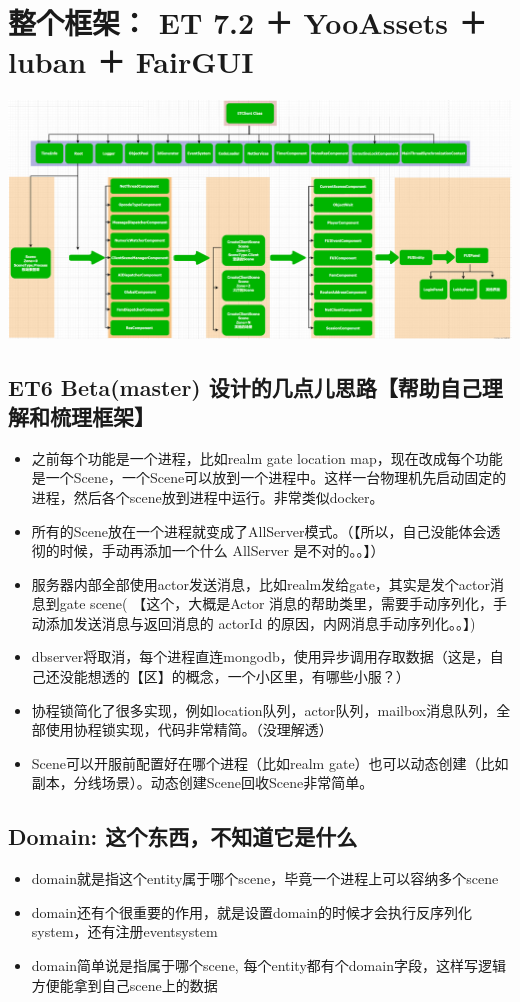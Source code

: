 \documentclass[9pt, b5paper]{article}
\begin{document}
\section{整个框架： ET 7.2 ＋ YooAssets ＋ luban ＋ FairGUI}
\label{sec-13}

\includegraphics[width=.9\linewidth]{./pic/ET_20230512_143227.png}
\subsection{ET6 Beta(master) 设计的几点儿思路【帮助自己理解和梳理框架】}
\label{sec-13-1}
\begin{itemize}
\item 之前每个功能是一个进程，比如realm gate location map，现在改成每个功能是一个Scene，一个Scene可以放到一个进程中。这样一台物理机先启动固定的进程，然后各个scene放到进程中运行。非常类似docker。
\item 所有的Scene放在一个进程就变成了AllServer模式。（【所以，自己没能体会透彻的时候，手动再添加一个什么 AllServer 是不对的。。】）
\item 服务器内部全部使用actor发送消息，比如realm发给gate，其实是发个actor消息到gate scene( 【这个，大概是Actor 消息的帮助类里，需要手动序列化，手动添加发送消息与返回消息的 actorId 的原因，内网消息手动序列化。。】)
\item dbserver将取消，每个进程直连mongodb，使用异步调用存取数据（这是，自己还没能想透的【区】的概念，一个小区里，有哪些小服？）
\item 协程锁简化了很多实现，例如location队列，actor队列，mailbox消息队列，全部使用协程锁实现，代码非常精简。（没理解透）
\item Scene可以开服前配置好在哪个进程（比如realm gate）也可以动态创建（比如副本，分线场景）。动态创建Scene回收Scene非常简单。
\end{itemize}
\subsection{Domain: 这个东西，不知道它是什么}
\label{sec-13-2}
\begin{itemize}
\item domain就是指这个entity属于哪个scene，毕竟一个进程上可以容纳多个scene
\item domain还有个很重要的作用，就是设置domain的时候才会执行反序列化system，还有注册eventsystem
\item domain简单说是指属于哪个scene, 每个entity都有个domain字段，这样写逻辑方便能拿到自己scene上的数据
\end{itemize}
\end{document}

